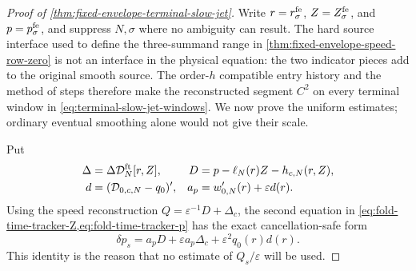 \begin{proof}[Proof of
\cref{thm:fixed-envelope-terminal-slow-jet}]
Write \(r=r_\sigma^{\rm fe}\), \(Z=Z_\sigma^{\rm fe}\), and
\(p=p_\sigma^{\rm fe}\), and suppress \(N,\sigma\) where no ambiguity can
result.  The hard source interface used to define the three-summand range
in \cref{thm:fixed-envelope-speed-row-zero} is not an interface in the
physical equation: the two indicator pieces add to the original smooth
source.  The order-\(h\) compatible entry history and the method of steps
therefore make the reconstructed segment \(C^2\) on every terminal window
in \cref{eq:terminal-slow-jet-windows}.  We now prove the uniform estimates;
ordinary eventual smoothing alone would not give their scale.

Put
\begin{align*}
 \Delta&=\Delta\mathcal D_N^{\rm ft}[r,Z],
 &D&=p-\ell_N(r)Z-h_{c,N}(r,Z),\\
 d&=(\mathcal D_{0,c,N}-q_0)',
 &a_p&=w_{0,N}'(r)+\varepsilon d(r).
\end{align*}
Using the speed reconstruction \(Q=\varepsilon^{-1}D+\Delta_c\), the
second equation in
\cref{eq:fold-time-tracker-Z,eq:fold-time-tracker-p} has the exact
cancellation-safe form
\begin{equation}
 \delta p_s=a_p D+\varepsilon a_p\Delta_c
                 +\varepsilon^2q_0(r)d(r).       \label{eq:proof-terminal-jet-p-eliminated}
\end{equation}
This identity is the reason that no estimate of \(Q_s/\varepsilon\) will
be used.


\end{proof}
